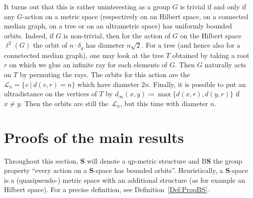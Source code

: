 \documentclass[a4paper]{article}
\theoremstyle{definition}
\newcommand*{\BS}{B$\mathbf{S}$}
\newcommand{\setst}[2]{\{#1\ |\ #2\}}
\begin{document}
It turns out that this is rather uninteresting as a group $G$ is trivial if and only if any $G$-action on a metric space (respectively on an Hilbert space, on a connected median graph, on a tree or on an ultrametric space) has uniformly bounded orbits.
Indeed, if $G$ is non-trivial, then for the action of $G$ on the Hilbert space $\ell^2(G)$ the orbit of $n\cdot \delta_g$ has diameter $n\sqrt2$.
For a tree (and hence also for a connetected median graph), one may look at the tree $T$ obtained by taking a root $r$ on which we glue an infinite ray for each elements of $G$. Then $G$ naturally acts on $T$ by permuting the rays. The orbits for this action are the $\mathcal L_n=\setst{v}{d(v,r)=n}$ which have diameter $2n$.
Finally, it is possible to put an ultradistance on the vertices of $T$ by  $d_\infty(x,y)\coloneqq\max\{d(x,r),d(y,r)\}$ if $x\neq y$. Then the orbits are still the~$\mathcal L_n$, but this time with diameter $n$.
%
%
%
%
%
%
%
%
%
%
\section{Proofs of the main results}
\label{Section:Proof}
%
%
%
Throughout this section, $\mathbf{S}$ will denote a qp-metric structure and \BS{} the group property ``every action on a $\mathbf{S}$-space has bounded orbits''.
Heuristically, a $\mathbf{S}$-space is a (quasipseudo-) metric space with an additional structure (as for example an Hilbert space). For a precise definition, see Definition~\ref{Def:PropBS}.
\end{document}
